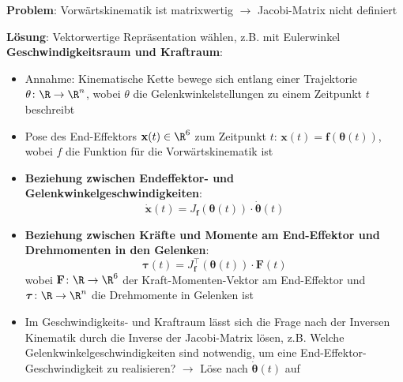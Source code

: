 \textbf{Problem}: Vorwärtskinematik ist matrixwertig $\rightarrow$ Jacobi-Matrix nicht definiert

\textbf{Lösung}: Vektorwertige Repräsentation wählen, z.B. mit Eulerwinkel\\

\textbf{Geschwindigkeitsraum und Kraftraum}:
\begin{itemize}
	\item Annahme: Kinematische Kette bewege sich entlang einer Trajektorie $\theta\colon\R\rightarrow\R^n$, wobei $\theta$ die Gelenkwinkelstellungen zu einem Zeitpunkt $t$ beschreibt
	\item Pose des End-Effektors $\mathbf{x}(t)\in\R^6$ zum Zeitpunkt $t$: $\mathbf{x}(t)=\mathbf{f}(\boldsymbol{\theta}(t))$, wobei $f$ die Funktion für die Vorwärtskinematik ist
	\item \textbf{Beziehung zwischen Endeffektor- und Gelenkwinkelgeschwindigkeiten}: $$\mathbf{\dot{x}}(t)=J_\mathbf{f}(\boldsymbol{\theta}(t))\cdot\boldsymbol{\dot{\theta}}(t)$$
	\item \textbf{Beziehung zwischen Kräfte und Momente am End-Effektor und Drehmomenten in den Gelenken}:
	$$\boldsymbol{\tau}(t)=J_\mathbf{f}^\top(\boldsymbol{\theta}(t))\cdot\mathbf{F}(t)$$
	wobei $\mathbf{F}\colon\R\rightarrow\R^6$ der Kraft-Momenten-Vektor am End-Effektor und $\boldsymbol{\tau}\colon\R\rightarrow\R^n$ die Drehmomente in Gelenken ist
	\item Im Geschwindigkeits- und Kraftraum lässt sich die Frage nach der Inversen Kinematik durch die Inverse der Jacobi-Matrix lösen, z.B. Welche Gelenkwinkelgeschwindigkeiten sind notwendig, um eine End-Effektor-Geschwindigkeit zu realisieren? $\rightarrow$ Löse nach $\boldsymbol{\dot{\theta}}(t)$ auf
\end{itemize}
